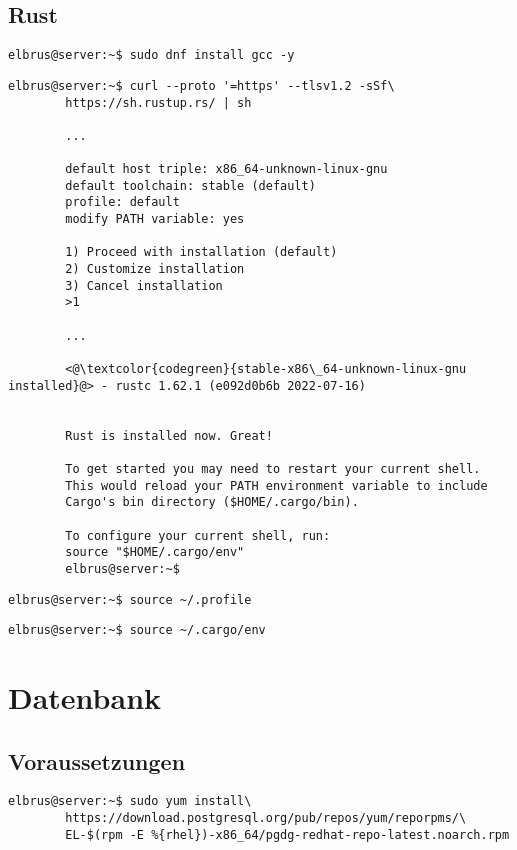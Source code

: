 \documentclass{article}
\begin{document}
	\newpage
	\subsection{Rust}
	
	\begin{lstlisting}[caption={Installieren von GNU Compiler Collection.}]
		elbrus@server:~$ sudo dnf install gcc -y
	\end{lstlisting}
	
	\lstset{style=commands}
	\begin{lstlisting}[caption={Installieren von Rust}]
		elbrus@server:~$ curl --proto '=https' --tlsv1.2 -sSf\
		https://sh.rustup.rs/ | sh
		 
		...
		 
		default host triple: x86_64-unknown-linux-gnu
		default toolchain: stable (default)
		profile: default
		modify PATH variable: yes
		
		1) Proceed with installation (default)
		2) Customize installation
		3) Cancel installation
		>1
		
		...
		
		<@\textcolor{codegreen}{stable-x86\_64-unknown-linux-gnu installed}@> - rustc 1.62.1 (e092d0b6b 2022-07-16)
		
		
		Rust is installed now. Great!
		
		To get started you may need to restart your current shell.
		This would reload your PATH environment variable to include
		Cargo's bin directory ($HOME/.cargo/bin).
		
		To configure your current shell, run:
		source "$HOME/.cargo/env"
		elbrus@server:~$
	\end{lstlisting}

	\begin{lstlisting}[caption={Laden der Variablen aus dem Terminal Profil.}]
		elbrus@server:~$ source ~/.profile
	\end{lstlisting}

	\begin{lstlisting}[caption={Hinzufügen des Befehls Cargo zu dem Pfad.}]
		elbrus@server:~$ source ~/.cargo/env
	\end{lstlisting}
	\newpage

	\section{Datenbank}
	\subsection[dependencies]{Voraussetzungen}
	\lstset{style=commands}
	\begin{lstlisting}[caption={Hinzufügen des PostgreSQL Drittanbieter-Repository, um die neuesten PostgreSQL-Pakete zu erhalten.}]
		elbrus@server:~$ sudo yum install\
		https://download.postgresql.org/pub/repos/yum/reporpms/\
		EL-$(rpm -E %{rhel})-x86_64/pgdg-redhat-repo-latest.noarch.rpm
	\end{lstlisting}
\end{document}
